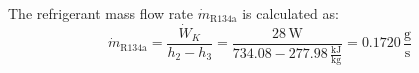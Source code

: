 The refrigerant mass flow rate \( \dot{m}_{\text{R134a}} \) is calculated as:  
\[
\dot{m}_{\text{R134a}} = \frac{\dot{W}_K}{h_2 - h_3} = \frac{28 \, \text{W}}{734.08 - 277.98 \, \frac{\text{kJ}}{\text{kg}}} = 0.1720 \, \frac{\text{g}}{\text{s}}
\]